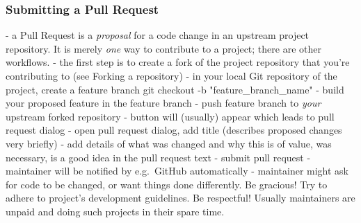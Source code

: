 \begin{frame}
    \frametitle{Submitting a Pull Request}
    - a Pull Request is a \emph{proposal} for a code change in an upstream
    project repository.  It is merely \emph{one} way to contribute to a
    project; there are other workflows.
    - the first step is to create a fork of the project repository that
    you're contributing to (see Forking a repository)
    - in your local Git repository of the project, create a feature branch
    git checkout -b "feature\_branch\_name"
    - build your proposed feature in the feature branch
    - push feature branch to \emph{your} upstream forked repository
    - button will (usually) appear which leads to pull request dialog
    - open pull request dialog, add title (describes proposed changes very
    briefly)
    - add details of what was changed and why this is of value, was
    necessary, is a good idea in the pull request text
    - submit pull request
    - maintainer will be notified by e.g.\ GitHub automatically
    - maintainer might ask for code to be changed, or want things done
    differently. Be gracious! Try to adhere to project's development
    guidelines. Be respectful! Usually maintainers are unpaid and doing such
    projects in their spare time.
\end{frame}


